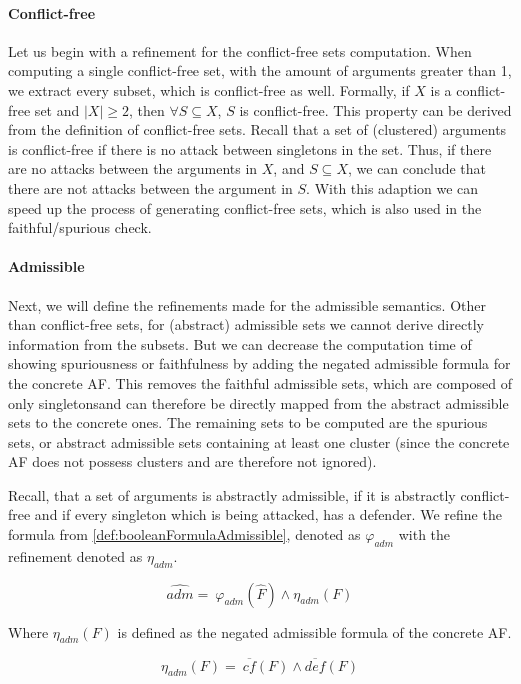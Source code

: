 \paragraph{Conflict-free} Let us begin with a refinement for the conflict-free sets computation. When computing a single conflict-free set, with the amount of arguments greater than 1, we extract every subset, which is conflict-free as well. Formally, if $X$ is a conflict-free set and $|X|\geq 2$, then $\forall S \subseteq X$, $S$ is conflict-free. This property can be derived from the definition of conflict-free sets. Recall that a set of (clustered) arguments is conflict-free if there is no attack between singletons in the set. Thus, if there are no attacks between the arguments in $X$, and $S \subseteq X$, we can conclude that there are not attacks between the argument in $S$. With this adaption we can speed up the process of generating conflict-free sets, which is also used in the faithful/spurious check.

\paragraph{Admissible} Next, we will define the refinements made for the admissible semantics. Other than conflict-free sets, for (abstract) admissible sets we cannot derive directly information from the subsets. But we can decrease the computation time of showing spuriousness or faithfulness by adding the negated admissible formula for the concrete AF. This removes the faithful admissible sets, which are composed of only singletonsand can therefore be directly mapped from the abstract admissible sets to the concrete ones. The remaining sets to be computed are the spurious sets, or abstract admissible sets containing at least one cluster (since the concrete AF does not possess clusters and are therefore not ignored).

Recall, that a set of arguments is abstractly admissible, if it is abstractly conflict-free and if every singleton which is being attacked, has a defender. We refine the formula from \cref{def:booleanFormulaAdmissible}, denoted as $\varphi_{adm}$ with the refinement denoted as $\eta_{adm}$.


$$
    \hat{adm}=\ \varphi_{adm}(\hat{F}) \land \eta_{adm}(F)
$$


Where $\eta_{adm}(F)$ is defined as the negated admissible formula of the concrete AF.


$$
    \eta_{adm}(F)=\ \overline{cf}(F) \land \overline{def}(F)
$$


